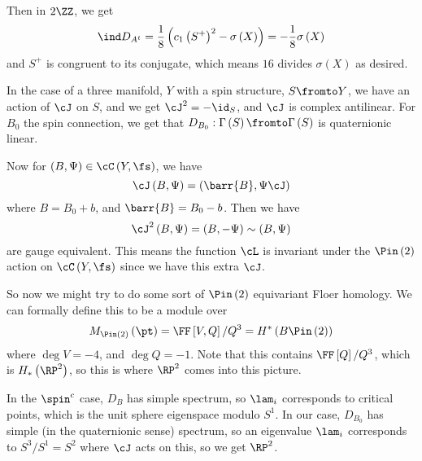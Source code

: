 \documentclass{amsart}
\begin{document}
Then in $2\ZZ$, we get
\begin{equation}
\ind D_{A^t} = \frac{1}{8}\left( c_1\left( S^+ \right)^2 - \sigma\left( X \right) \right)
= -\frac{1}{8}\sigma\left( X \right)
\end{equation}
and $S^+$ is congruent to its conjugate, which means $16$ divides $\sigma\left( X \right)$
as desired.

In the case of a three manifold, $Y$
with a spin structure, $S\fromto Y$,
we have an action of $\cJ$ on $S$, and
we get $\cJ^2 =-\id_S$, and $\cJ$ is complex antilinear.
For $B_0$ the spin connection, we get that $D_{B_0}:\Gamma\left( S \right)\fromto \Gamma\left( S \right)$
is quaternionic linear.

Now for $\left( B, \Psi \right)\in \cC\left( Y , \fs \right)$, 
we have
\begin{equation}
\cJ\left( B , \Psi \right) = \left( \barr{B }, \Psi \cJ \right)
\end{equation}
where $B = B_0 + b$, and $\barr{B} = B_0 - b$. 
Then we have
\begin{equation}
\cJ^2 \left( B , \Psi \right) = \left( B , -\Psi \right) \sim \left( B , \Psi \right)
\end{equation}
are gauge equivalent. 
This means the function $\cL$ is invariant under the $\Pin\left( 2 \right)$ action
on $\cC\left( Y , \fs \right)$ since we have this extra $\cJ$.

So now we might try to do some sort of $\Pin\left( 2 \right)$ equivariant Floer homology.
We can formally define this to be a module over
\begin{equation}
M_{\Pin\left( 2 \right)}\left( \pt \right) = 
\FF\left[ V , Q \right] / Q^3 = H^*\left( B\Pin\left( 2 \right) \right)
\end{equation}
where $\deg V = -4$, and $\deg Q = -1$. 
Note that this contains $\FF\left[ Q \right] / Q^3$, which is $H_*\left( \RP^2 \right)$, 
so this is where $\RP^2$ comes into this picture. 

In the $\spin^c$ case, $D_B$
has simple spectrum, so $\lam_i$ corresponds to critical points,
which is the unit sphere eigenspace modulo $S^1$. 
In our case, $D_{B_0}$ has simple (in the quaternionic sense) spectrum,
so an eigenvalue $\lam_i$ corresponds to
$S^3 / S^1 = S^2$ where $\cJ$ acts on this, so we get $\RP^2$.


\end{document}
